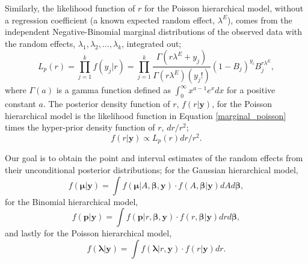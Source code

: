 \documentclass[article]{jss}
\begin{document}
Similarly, the likelihood function of $r$ for the Poisson hierarchical model, without a regression coefficient (a known expected random effect, $\lambda^E$), comes from the independent Negative-Binomial marginal distributions of the observed data with the random effects, $\lambda_1, \lambda_2, \ldots, \lambda_k$, integrated out;
\begin{equation}\label{marginal_poisson}
L_p(r)=\prod_{j=1}^k f(y_j\vert r)=\prod^{k}_{j=1} \frac{\Gamma(r \lambda^E+y_j)}{\Gamma(r\lambda^E)(y_j!)}(1-B_{j})^{y_{i}}B_{j}^{r \lambda^E},
\end{equation}
where $\Gamma(a)$ is a gamma function defined as $\int_0^\infty x^{a-1}e^{x}dx$ for a positive constant $a$. The posterior density function of $r$, $f(r\vert \boldsymbol{y})$, for the Poisson hierarchical model is  the likelihood function in Equation \ref{marginal_poisson} times the hyper-prior density function of $r$, $dr/r^2$;
\begin{equation}\label{marginal_post_poisson}
f(r \vert \boldsymbol{y})\propto L_p(r)dr/r^2.
\end{equation}



Our goal is to obtain the point and interval estimates of the random effects from their unconditional posterior distributions; for the Gaussian hierarchical model, 
\begin{equation}\label{mcintegration_normal}
f(\boldsymbol{\mu}\vert \boldsymbol{y})=\int  f(\boldsymbol{\mu}\vert A, \boldsymbol{\beta}, \boldsymbol{y})\cdot f(A, \boldsymbol{\beta}\vert \boldsymbol{y})dA d\boldsymbol{\beta},
\end{equation}
for the Binomial hierarchical model, 
\begin{equation}\label{mcintegration_binomial}
f(\boldsymbol{p}\vert \boldsymbol{y})=\int  f(\boldsymbol{p}\vert r, \boldsymbol{\beta}, \boldsymbol{y})\cdot f(r, \boldsymbol{\beta}\vert \boldsymbol{y})dr d\boldsymbol{\beta},
\end{equation}
and lastly for the Poisson hierarchical model, 
\begin{equation}\label{mcintegration_poisson}
f(\boldsymbol{\lambda}\vert \boldsymbol{y})=\int  f(\boldsymbol{\lambda}\vert r, \boldsymbol{y})\cdot f(r\vert \boldsymbol{y})dr.
\end{equation}
\end{document}
